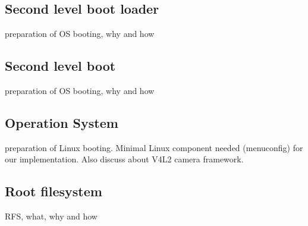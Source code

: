 \subsection {Second level boot loader}
preparation of OS booting, why and how
\subsection {Second level boot }
preparation of OS booting, why and how
\subsection {Operation System}
preparation of Linux booting. Minimal Linux component needed
(menuconfig) for our implementation. Also discuss about V4L2 camera
framework.
\subsection {Root filesystem}
RFS, what, why and how
